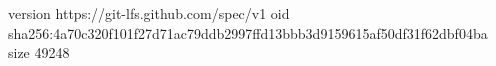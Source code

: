 version https://git-lfs.github.com/spec/v1
oid sha256:4a70c320f101f27d71ac79ddb2997ffd13bbb3d9159615af50df31f62dbf04ba
size 49248
